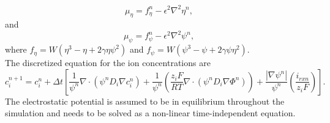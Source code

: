 \documentclass[10pt]{article}
\begin{document}
\begin{equation}
\label{mueta_eq_td}
\mu_\eta=f_\eta^n -\epsilon^2 \nabla^2 \eta^n,
\end{equation}
and
\begin{equation}
\label{mupsi_eq_td}
\mu_\psi=f_\psi^n -\epsilon^2 \nabla^2 \psi^n,
\end{equation}
where $f_\eta=W \left( \eta^3 - \eta +2 \gamma \eta \psi^2 \right)$ and $f_\psi= W \left( \psi^3 - \psi +2 \gamma \psi  \eta^2 \right)$.\\
The discretized equation for the ion concentrations are
\begin{equation}
\label{conc_eq_td}
c_i ^{n+1}= c_i^n  + \Delta t  \left[ \frac{1}{\psi^n} \nabla \cdot (\psi^n D_i \nabla c_i^n) + \frac{1}{\psi^n} \left( \frac{z_i F}{RT} \nabla \cdot (\psi^n D_i \nabla \Phi^n) \right)+ \frac{|\nabla \psi^n|}{\psi^n} \left( \frac{i_{rxn}}{z_i F} \right) \right].
\end{equation}
The electrostatic potential is assumed to be in equilibrium throughout the simulation and needs to be solved as a non-linear time-independent equation.
\end{document}
